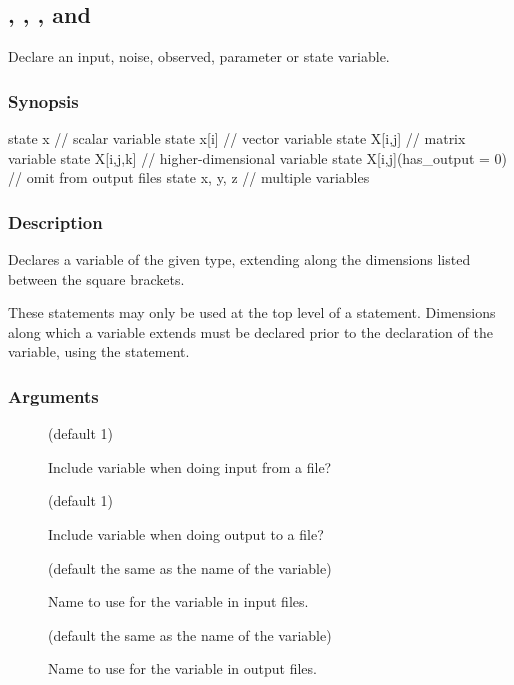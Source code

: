 \subsection{\label{input}, \label{noise}, \label{obs}, \label{param} and \label{state}}

Declare an input, noise, observed, parameter or state variable.

\subsubsection*{Synopsis\label{var_Synopsis}}

\begin{bicode}
state x                       // scalar variable
state x[i]                    // vector variable
state X[i,j]                  // matrix variable
state X[i,j,k]                // higher-dimensional variable
state X[i,j](has_output = 0)  // omit from output files
state x, y, z                 // multiple variables
\end{bicode}

\subsubsection*{Description\label{var_Description}}

Declares a variable of the given type, extending along the dimensions listed
between the square brackets.

These statements may only be used at the top level of a 
statement. Dimensions along which a variable extends must be declared
prior to the declaration of the variable, using the  statement.

\subsubsection*{Arguments\label{var_Arguments}}

\begin{description}
\item[] (default 1)

Include variable when doing input from a file?

\item[] (default 1)

Include variable when doing output to a file?

\item[] (default the same as the name of the
  variable)

Name to use for the variable in input files.

\item[] (default the same as the name of the
  variable)

Name to use for the variable in output files.

\end{description}

